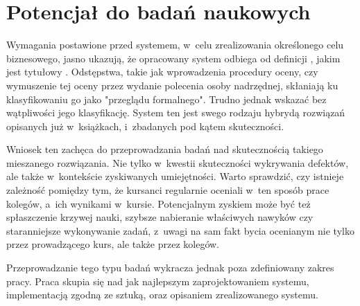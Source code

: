 \chapter{Potencjał do badań naukowych}
Wymagania postawione przed systemem, w~celu zrealizowania określonego celu biznesowego, jasno ukazują, że opracowany system odbiega od definicji , jakim jest tytułowy . Odstępstwa, takie jak wprowadzenia procedury oceny, czy wymuszenie tej oceny przez wydanie polecenia osoby nadrzędnej, skłaniają ku klasyfikowaniu go jako "przeglądu formalnego". Trudno jednak wskazać bez wątpliwości jego klasyfikację. System ten jest swego rodzaju hybrydą rozwiązań opisanych już w~książkach, i~zbadanych pod kątem skuteczności.

\medskip
Wniosek ten zachęca do przeprowadzania badań nad skutecznością takiego mieszanego rozwiązania. Nie tylko w~kwestii skuteczności wykrywania defektów, ale także w~kontekście zyskiwanych umiejętności. Warto sprawdzić, czy istnieje zależność pomiędzy tym, że kursanci regularnie oceniali w~ten sposób prace kolegów, a~ich wynikami w~kursie. Potencjalnym zyskiem może być też spłaszczenie krzywej nauki, szybsze nabieranie właściwych nawyków czy staranniejsze wykonywanie zadań, z~uwagi na sam fakt bycia ocenianym nie tylko przez prowadzącego kurs, ale także przez kolegów.

\medskip
Przeprowadzanie tego typu badań wykracza jednak poza zdefiniowany zakres pracy. Praca skupia się nad jak najlepszym zaprojektowaniem systemu, implementacją zgodną ze sztuką, oraz opisaniem zrealizowanego systemu.


